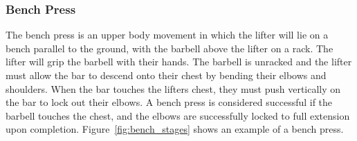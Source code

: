 \subsubsection{Bench Press}

The bench press is an upper body movement in which the lifter will lie on a bench parallel to the ground, with the barbell above the lifter on a rack. The lifter will grip the barbell with their hands. The barbell is unracked and the lifter must allow the bar to descend onto their chest by bending their elbows and shoulders. When the bar touches the lifters chest, they must push vertically on the bar to lock out their elbows. A bench press is considered successful if the barbell touches the chest, and the elbows are successfully locked to full extension upon completion. Figure~\ref{fig:bench_stages} shows an example of a bench press.

